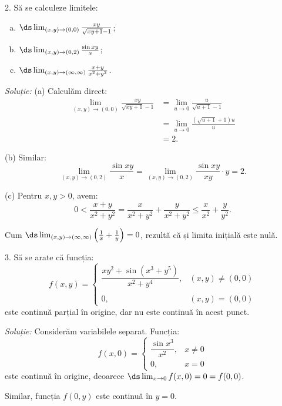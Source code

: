 2. Să se calculeze limitele:
\begin{enumerate}[(a)]
\item $\ds\lim_{(x, y) \to (0, 0)} \frac{xy}{\sqrt{xy + 1} - 1}$;
\item $\ds\lim_{(x, y) \to (0, 2)} \frac{\sin xy}{x}$;
\item $\ds\lim_{(x, y) \to (\infty, \infty)} \frac{x + y}{x^2 + y^2}$.
\end{enumerate}

\emph{Soluție:} (a) Calculăm direct:
\begin{align*}
  \lim_{(x, y) \to (0, 0)} \frac{xy}{\sqrt{xy + 1} - 1} &= \lim_{u \to 0} \frac{u}{\sqrt{u + 1} - 1} \\
                                                        &= \lim_{u \to 0} \frac{(\sqrt{u + 1} + 1)u}{u}\\
                                                        &= 2.
\end{align*}

(b) Similar:
\[
  \lim_{(x, y) \to (0, 2)} \frac{\sin xy}{x} = \lim_{(x, y) \to (0, 2)} \frac{\sin xy}{xy} \cdot y = 2.
\]

(c) Pentru $x, y > 0$, avem:
\[
  0 < \frac{x + y}{x^2 + y^2} = \frac{x}{x^2 + y^2} + \frac{y}{x^2 + y^2} \leq \frac{x}{x^2} + \frac{y}{y^2}.
\]

Cum $\ds\lim_{(x, y) \to (\infty, \infty)} \Big( \frac{1}{x} + \frac{1}{y} \Big) = 0$, rezultă
că și limita inițială este nulă.

\vspace{0.5cm}

3. Să se arate că funcția:
\[
  f(x, y) = \begin{cases}
    \dfrac{xy^2 + \sin(x^3 + y^5)}{x^2 + y^4}, & (x, y) \neq (0, 0) \\
    & \\
    0, & (x, y) = (0, 0)
  \end{cases}
\]
este continuă parțial în origine, dar nu este continuă în acest punct.

\emph{Soluție:} Considerăm variabilele separat. Funcția:
\[
  f(x, 0) = \begin{cases}
    \dfrac{\sin x^3}{x^2}, & x \neq 0 \\
    0, & x = 0
  \end{cases}
\]
este continuă în origine, deoarece $\ds\lim_{x \to 0} f(x, 0) = 0 = f(0, 0)$.

Similar, funcția $f(0, y)$ este continuă în $y = 0$.

